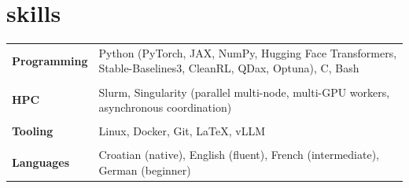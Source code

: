 \documentclass[a4paper]{article}
\makeatletter
\newlength{\tablewidth}
\newenvironment{skills}{%
\setlength{\tablewidth}{\linewidth}
\addtolength{\tablewidth}{-2\tabcolsep}
\begin{tabular}{@{}p{0.15\tablewidth}p{0.85\tablewidth}@{}}
}{%
\end{tabular}
}
\makeatother
\begin{document}
\vspace{-0.23em}
\section{skills}
\begin{skills}
    \textbf{Programming} & Python (PyTorch, JAX, NumPy, Hugging Face Transformers, Stable-Baselines3, CleanRL, QDax, Optuna), C, Bash \\
    \\
    \textbf{HPC} & Slurm, Singularity (parallel multi-node, multi-GPU workers, asynchronous coordination) \\
    \\
    \textbf{Tooling} & Linux, Docker, Git, LaTeX, vLLM \\
    \\
    \textbf{Languages} & Croatian (native), English (fluent), French (intermediate), German (beginner) \\
\end{skills}
\end{document}
